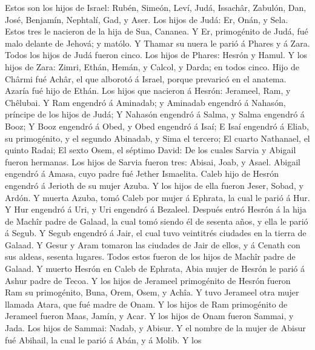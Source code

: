  Estos son los hijos de Israel: Rubén, Simeón, Leví, Judá,
Issachâr, Zabulón,  Dan, José, Benjamín, Nephtalí, Gad, y
Aser.  Los hijos de Judá: Er, Onán, y Sela. Estos tres le
nacieron de la hija de Sua, Cananea. Y Er, primogénito de Judá, fué malo
delante de Jehová; y matólo.  Y Thamar su nuera le parió á
Phares y á Zara. Todos los hijos de Judá fueron cinco.  Los
hijos de Phares: Hesrón y Hamul.  Y los hijos de Zara:
Zimri, Ethán, Hemán, y Calcol, y Darda; en todos cinco. 
Hijo de Chârmi fué Achâr, el que alborotó á Israel, porque prevaricó en
el anatema.  Azaría fué hijo de Ethán.  Los
hijos que nacieron á Hesrón: Jerameel, Ram, y Chêlubai.  Y
Ram engendró á Aminadab; y Aminadab engendró á Nahasón, príncipe de los
hijos de Judá;  Y Nahasón engendró á Salma, y Salma
engendró á Booz;  Y Booz engendró á Obed, y Obed engendró á
Isaí;  E Isaí engendró á Eliab, su primogénito, y el
segundo Abinadab, y Sima el tercero;  El cuarto Nathanael,
el quinto Radai;  El sexto Osem, el séptimo David:
 De los cuales Sarvia y Abigail fueron hermanas. Los hijos
de Sarvia fueron tres: Abisai, Joab, y Asael.  Abigail
engendró á Amasa, cuyo padre fué Jether Ismaelita.  Caleb
hijo de Hesrón engendró á Jerioth de su mujer Azuba. Y los hijos de ella
fueron Jeser, Sobad, y Ardón.  Y muerta Azuba, tomó Caleb
por mujer á Ephrata, la cual le parió á Hur.  Y Hur
engendró á Uri, y Uri engendró á Bezaleel.  Después entró
Hesrón á la hija de Machîr padre de Galaad, la cual tomó siendo él de
sesenta años, y ella le parió á Segub.  Y Segub engendró á
Jair, el cual tuvo veintitrés ciudades en la tierra de Galaad.
 Y Gesur y Aram tomaron las ciudades de Jair de ellos, y á
Cenath con sus aldeas, sesenta lugares. Todos estos fueron de los hijos
de Machîr padre de Galaad.  Y muerto Hesrón en Caleb de
Ephrata, Abia mujer de Hesrón le parió á Ashur padre de Tecoa.
 Y los hijos de Jerameel primogénito de Hesrón fueron Ram
su primogénito, Buna, Orem, Osem, y Achîa.  Y tuvo Jerameel
otra mujer llamada Atara, que fué madre de Onam.  Y los
hijos de Ram primogénito de Jerameel fueron Maas, Jamín, y Acar.
 Y los hijos de Onam fueron Sammai, y Jada. Los hijos de
Sammai: Nadab, y Abisur.  Y el nombre de la mujer de Abisur
fué Abihail, la cual le parió á Abán, y á Molib.  Y los
